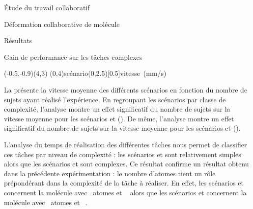 \documentclass[myfrancais]{mythesis}
\begin{document}
\begin{mypart}{Étude du travail collaboratif}
\begin{mychapter}{Déformation collaborative de molécule}
\begin{mysection}{Résultats}
\begin{mysubsection}{Gain de performance sur les tâches complexes}
					\begin{myfigure}
						\begin{myps}(-0.5,-0.9)(4,3)
							\myaxes(0,4){scénario}(0,2.5)[0.5]{vitesse~(mm/s)}
						\end{myps}
					\end{myfigure}

					La  présente la vitesse moyenne  des différents scénarios  en fonction du nombre de sujets  ayant réalisé l'expérience.
					En regroupant les scénarios par classe de complexité, l'analyse montre un effet significatif du nombre de sujets  sur la vitesse moyenne  pour les scénarios  et  ().
					De même, l'analyse montre un effet significatif du nombre de sujets  sur la vitesse moyenne  pour les scénarios  et  ().

					L'analyse du temps de réalisation des différentes tâches nous permet de classifier ces tâches par niveau de complexité : les scénarios  et  sont relativement simples alors que les scénarios  et  sont complexes.
					Ce résultat confirme un résultat obtenu dans la précédente expérimentation  : le nombre d'atomes tient un rôle prépondérant dans la complexité de la tâche à réaliser.
					En effet, les scénarios  et  concernent la molécule \myTRPZIPPER avec ~atomes et ~ alors que les scénarios  et  concernent la molécule \myTRPZIPPER avec ~atomes et ~.


\end{mysubsection}
\end{mysection}
\end{mychapter}
\end{mypart}
\end{document}
